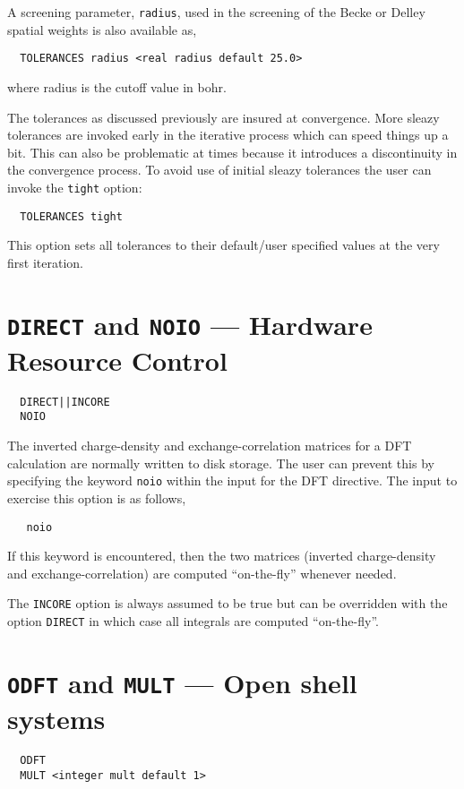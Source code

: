 A screening parameter, \verb+radius+, used in the screening of the
Becke or Delley spatial weights is also available as,
\begin{verbatim}
  TOLERANCES radius <real radius default 25.0>
\end{verbatim}
where radius is the cutoff value in bohr.

The tolerances as discussed previously are insured at convergence.
More sleazy tolerances are invoked early in the iterative process
which can speed things up a bit.  This can also be problematic at
times because it introduces a discontinuity in the convergence
process.  To avoid use of initial sleazy tolerances the user can
invoke the \verb+tight+ option:

\begin{verbatim}
  TOLERANCES tight 
\end{verbatim}

This option sets all tolerances to their
default/user specified values at the very first iteration.


\section{{\tt DIRECT} and {\tt NOIO} --- Hardware Resource Control}
\begin{verbatim}
  DIRECT||INCORE
  NOIO
\end{verbatim}

\sloppy

The inverted charge-density and exchange-correlation matrices
for a DFT calculation are normally written to disk storage.  The user
can prevent this by specifying the keyword \verb+noio+ within the
input for the DFT directive.  The input to exercise this option is
as follows,
\begin{verbatim}
   noio
\end{verbatim}
If this keyword is encountered, then the two matrices (inverted
charge-density and exchange-correlation) are computed ``on-the-fly''
whenever needed.  

The \verb+INCORE+ option is always assumed to be true but can be
overridden with the option \verb+DIRECT+ in which case all integrals
are computed ``on-the-fly''.

\fussy

\section{{\tt ODFT} and {\tt MULT} --- Open shell systems}
\begin{verbatim}
  ODFT
  MULT <integer mult default 1>
\end{verbatim}

